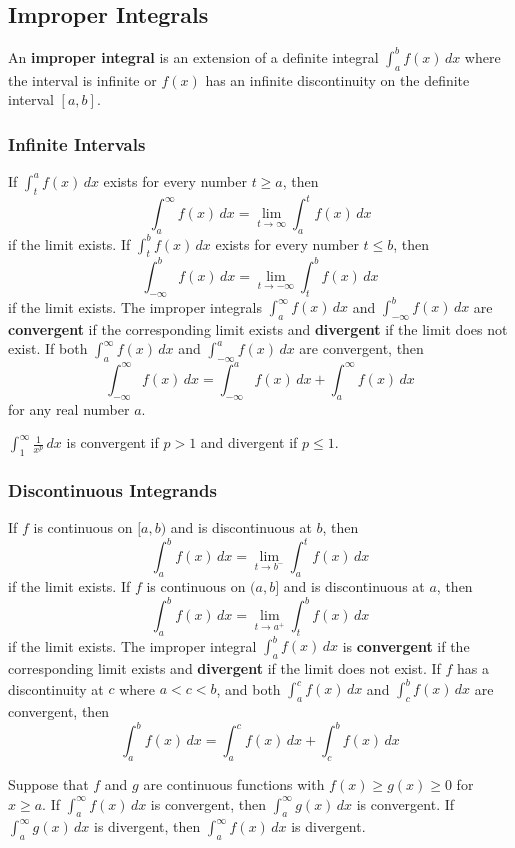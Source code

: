 \subsection{Improper Integrals}
An \textbf{improper integral} is an extension of a definite integral
\(\displaystyle{\int_a^b f(x)\,dx}\) where the interval is infinite or
\(f(x)\) has an infinite discontinuity on the definite interval \([a,b]\).

\subsubsection*{Infinite Intervals}
\begin{definition}
    If \(\displaystyle{\int_t^a f(x)\,dx}\) exists for every number
    \(t\geq a\), then
    \[\int_a^\infty f(x)\,dx=\lim_{t\to\infty}\int_a^t f(x)\,dx\]
    if the limit exists.
    If \(\displaystyle{\int_t^b f(x)\,dx}\) exists for every number
    \(t\leq b\), then
    \[\int_{-\infty}^b f(x)\,dx=\lim_{t\to -\infty}\int_t^b f(x)\,dx\]
    if the limit exists.
    The improper integrals \(\displaystyle{\int_a^\infty f(x)\,dx}\) and
    \(\displaystyle{\int_{-\infty}^b f(x)\,dx}\) are \textbf{convergent} if
    the corresponding limit exists and \textbf{divergent} if the limit does
    not exist.
    If both \(\displaystyle{\int_a^\infty f(x)\,dx}\) and
    \(\displaystyle{\int_{-\infty}^a f(x)\,dx}\) are convergent, then
    \[\int_{-\infty}^{\infty}f(x)\,dx
    =\int_{-\infty}^a f(x)\,dx+\int_a^\infty f(x)\,dx\]
    for any real number \(a\).
\end{definition}
\(\displaystyle{\int_1^\infty \frac{1}{x^p}\,dx}\) is convergent if \(p>1\)
and divergent if \(p\leq 1\).

\subsubsection*{Discontinuous Integrands}
\begin{definition}
    If \(f\) is continuous on \([a,b)\) and is discontinuous at \(b\), then
    \[\int_a^b f(x)\,dx=\lim_{t\to b^-}\int_a^t f(x)\,dx\]
    if the limit exists.
    If \(f\) is continuous on \((a,b]\) and is discontinuous at \(a\), then
    \[\int_a^b f(x)\,dx=\lim_{t\to a^+}\int_t^b f(x)\,dx\]
    if the limit exists.
    The improper integral \(\displaystyle{\int_a^b f(x)\,dx}\) is
    \textbf{convergent} if the corresponding limit exists and
    \textbf{divergent} if the limit does not exist.
    If \(f\) has a discontinuity at \(c\) where \(a<c<b\), and both
    \(\displaystyle{\int_a^c f(x)\,dx}\) and
    \(\displaystyle{\int_c^b f(x)\,dx}\) are convergent,
    then
    \[\int_a^b f(x)\,dx=\int_a^c f(x)\,dx+\int_c^b f(x)\,dx\]
\end{definition}

\begin{theorem}
    Suppose that \(f\) and \(g\) are continuous functions with
    \(f(x)\geq g(x)\geq 0\) for \(x\geq a\).
    If \(\displaystyle{\int_a^\infty f(x)\,dx}\) is convergent, then
    \(\displaystyle{\int_a^\infty g(x)\,dx}\) is convergent.
    If \(\displaystyle{\int_a^\infty g(x)\,dx}\) is divergent, then
    \(\displaystyle{\int_a^\infty f(x)\,dx}\) is divergent.
\end{theorem}